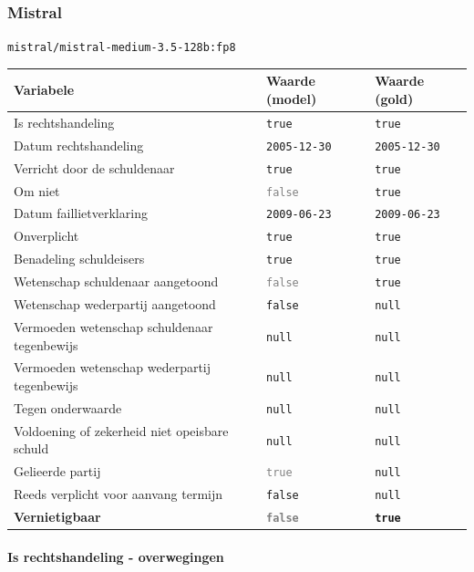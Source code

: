 \documentclass[
  dutch,
  a4paper,
]{article}
\begin{document}
\subsubsection{Mistral}\label{mistral-2}

\texttt{mistral/mistral-medium-3.5-128b:fp8}

\begin{center}
\small
\begin{tabular}{@{}p{7.4cm}p{2.6cm}p{2.6cm}@{}}
\toprule
Variabele & Waarde (model) & Waarde (gold) \\
\midrule
Is rechtshandeling & \texttt{true} & \texttt{true} \\
Datum rechtshandeling & \texttt{2005-12-30} & \texttt{2005-12-30} \\
Verricht door de schuldenaar & \texttt{true} & \texttt{true} \\
Om niet & \textcolor{gray}{\texttt{false}} & \texttt{true} \\
Datum faillietverklaring & \texttt{2009-06-23} & \texttt{2009-06-23} \\
Onverplicht & \texttt{true} & \texttt{true} \\
Benadeling schuldeisers & \texttt{true} & \texttt{true} \\
Wetenschap schuldenaar aangetoond & \textcolor{gray}{\texttt{false}} & \texttt{true} \\
Wetenschap wederpartij aangetoond & \texttt{false} & \texttt{null} \\
Vermoeden wetenschap schuldenaar tegenbewijs & \texttt{null} & \texttt{null} \\
Vermoeden wetenschap wederpartij tegenbewijs & \texttt{null} & \texttt{null} \\
Tegen onderwaarde & \texttt{null} & \texttt{null} \\
Voldoening of zekerheid niet opeisbare schuld & \texttt{null} & \texttt{null} \\
Gelieerde partij & \textcolor{gray}{\texttt{true}} & \texttt{null} \\
Reeds verplicht voor aanvang termijn & \texttt{false} & \texttt{null} \\
\textbf{Vernietigbaar} & \textbf{\textcolor{gray}{\texttt{false}}} & \textbf{\texttt{true}} \\
\bottomrule
\end{tabular}
\end{center}

\paragraph{Is rechtshandeling - overwegingen}\label{is-rechtshandeling---overwegingen-6}
\end{document}
